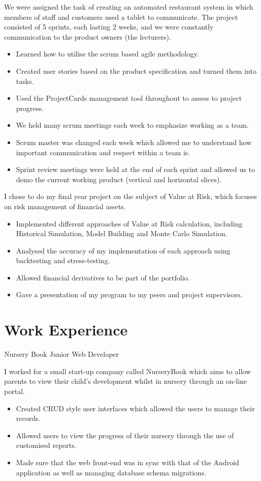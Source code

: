 \documentclass[10pt,a4paper]{moderncv}
\begin{document}
{
	We were assigned the task of creating an automated restaurant system in which members of staff and customers used a tablet to communicate. The project consisted of 5 sprints, each lasting 2 weeks, and we were constantly communication to the product owners (the lecturers).
	\begin{itemize}
		\item Learned how to utilise the scrum based agile methodology.
		\item Created user stories based on the product specification and turned them into tasks.
		\item Used the ProjectCards management tool throughout to assess to project progress.
		\item We held many scrum meetings each week to emphasize working as a team.
		\item Scrum master was changed each week which allowed me to understand how important communication and respect within a team is.
		\item Sprint review meetings were held at the end of each sprint and allowed us to demo the current working product (vertical and horizontal slices).
	\end{itemize}
}

{
	I chose to do my final year project on the subject of Value at Risk, which focuses on risk management of financial assets.
	\begin{itemize}
		\item Implemented different approaches of Value at Risk calculation, including Historical Simulation, Model Building and Monte Carlo Simulation.
		\item Analysed the accuracy of my implementation of each approach using backtesting and stress-testing.
		\item Allowed financial derivatives to be part of the portfolio.
		\item Gave a presentation of my program to my peers and project supervisors.
	\end{itemize}
}

\section{Work Experience}
{Nursery Book}
{Junior Web Developer}
{}
{}
{
	I worked for a small start-up company called NurseryBook which aims to allow parents to view their child's development whilst in nursery through an on-line portal.
	\begin{itemize}
		\item Created CRUD style user interfaces which allowed the users to manage their records.
		\item Allowed users to view the progress of their nursery through the use of customised reports.
		\item Made sure that the web front-end was in sync with that of the Android application as well as managing database schema migrations.
	\end{itemize}
}
\end{document}
